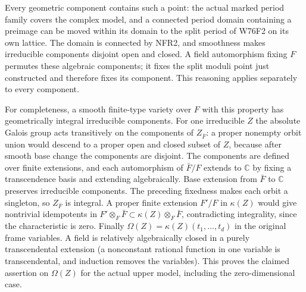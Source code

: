 Every geometric component contains such a point: the actual
marked period family covers the complex model, and a connected
period domain containing a preimage can be moved within its
domain to the split period of W76F2 on its own lattice. The
domain is connected by NFR2, and smoothness makes irreducible
components disjoint open and closed. A field automorphism fixing
$F$ permutes these algebraic components; it fixes the split
moduli point just constructed and therefore fixes its component.
This reasoning applies separately to every component.

For completeness, a smooth finite-type variety over $F$ with this
property has geometrically integral irreducible components. For
one irreducible $Z$ the absolute Galois group acts transitively
on the components of $Z_{\bar F}$: a proper nonempty orbit union
would descend to a proper open and closed subset of $Z$, because
after smooth base change the components are disjoint. The components
are defined over finite extensions, and each automorphism of
$\bar F/F$ extends to $\mathbb C$ by fixing a transcendence
basis and extending algebraically. Base extension from $\bar F$
to $\mathbb C$ preserves irreducible components. The preceding
fixedness makes each orbit a singleton, so $Z_{\bar F}$ is
integral. A proper finite extension $F'/F$ in $\kappa(Z)$
would give nontrivial idempotents in
$F'\otimes_F\bar F\subset\kappa(Z)\otimes_F\bar F$, contradicting
integrality, since the characteristic is zero. Finally
$\Omega(Z)=\kappa(Z)(t_1,\dots,t_d)$ in the original frame
variables. A field is relatively algebraically closed in a purely
transcendental extension (a nonconstant rational function in one
variable is transcendental, and induction removes the variables).
This proves the claimed assertion on $\Omega(Z)$ for the actual
upper model, including the zero-dimensional case.
